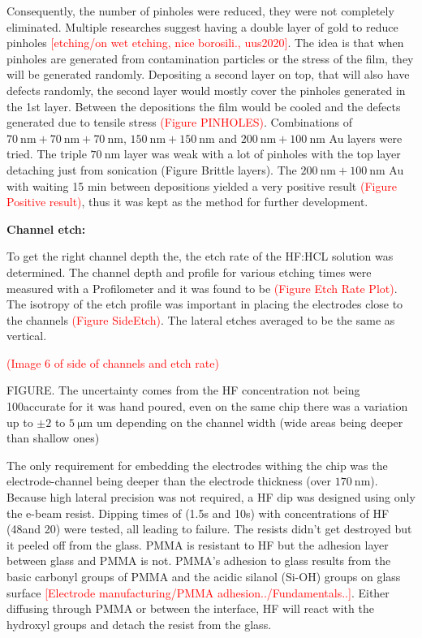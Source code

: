 \documentclass[draft]{jyflluk}
\begin{document}
Consequently, the number of pinholes were reduced, they were not completely eliminated. Multiple researches suggest having a double layer of gold to reduce pinholes \textcolor{red}{[etching/on wet etching, nice borosili., uus2020]}. The idea is that when pinholes are generated from contamination particles or the stress of the film, they will be generated randomly. Depositing a second layer on top, that will also have defects randomly, the second layer would mostly cover the pinholes generated in the 1st layer. Between the depositions the film would be cooled and the defects generated due to tensile stress \textcolor{red}{(Figure PINHOLES)}. 
Combinations of $\SI{70}{\nano \metre} + \SI{70}{\nano \metre} + \SI{70}{\nano \metre}$, $\SI{150}{\nano \metre}+ \SI{150}{\nano \metre}$ and $\SI{200}{\nano \metre} + \SI{100}{\nano \metre}$ Au layers were tried. The triple $\SI{70}{\nano \metre}$ layer was weak with a lot of pinholes with the top layer detaching just from sonication (Figure Brittle layers). The $\SI{200}{\nano \metre} + \SI{100}{\nano \metre}$  Au with waiting 15 min between depositions yielded a very positive result \textcolor{red}{(Figure Positive result)}, thus it was kept as the method for further development.

\textbf{Channel etch:}

To get the right channel depth the, the etch rate of the HF:HCL solution was determined. The channel depth and profile for various etching times were measured with a Profilometer and it was found to be  \textcolor{red}{(Figure Etch Rate Plot)}. The isotropy of the etch profile was important in placing the electrodes close to the channels \textcolor{red}{(Figure SideEtch)}. The lateral etches averaged to be the same as vertical. 

\textcolor{red}{(Image 6 of side of channels and etch rate)}

FIGURE. The uncertainty comes from the HF concentration not being 100\percent accurate for it was hand poured, even on the same chip there was a variation up to  $\pm 2$ to $\SI{5}{\micro \metre}$ um depending on the channel width (wide areas being deeper than shallow ones)

The only requirement for embedding the electrodes withing the chip was the electrode-channel being deeper than the electrode thickness (over $\SI{170}{\nano \metre}$). Because high lateral precision was not required, a HF dip was designed using only the e-beam resist. Dipping times of (1.5s and 10s) with concentrations of HF (48\percent and 20\percent) were tested, all leading to failure. The resists didn’t get destroyed but it peeled off from the glass. PMMA is resistant to HF but the adhesion layer between glass and PMMA is not. PMMA’s adhesion to glass results from the basic carbonyl groups of PMMA and the acidic silanol (Si-OH) groups on glass surface \textcolor{red}{[Electrode manufacturing/PMMA adhesion../Fundamentals..]}. Either diffusing through PMMA or between the interface, HF will react with the hydroxyl groups and detach the resist from the glass.
\end{document}
